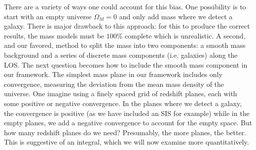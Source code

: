 There are a variety of ways one could account for this bias. One possibility is to start with an empty universe $\Omega_M = 0$ and only add mass where we detect a galaxy. There is major drawback to this approach: for this to produce the correct results, the mass models must be $100\%$ complete which is unrealistic. A second, and our favored, method to split the mass into two components: a smooth mass background and a series of discrete mass components (i.e. galaxies) along the LOS. The next question becomes how to include the smooth mass component in our framework. The simplest mass plane in our framework includes only convergence, measuring the deviation from the mean mass density of the universe. One imagine using a finely spaced grid of redshift planes, each with some positive or negative convergence. In the planes where we detect a galaxy, the convergence is positive (as we have included an SIS for example) while in the empty planes, we add a negative convergence to account for the empty space. But how many redshift planes do we need? Presumably, the more planes, the better. This is suggestive of an integral, which we will now examine more quantitatively.
  